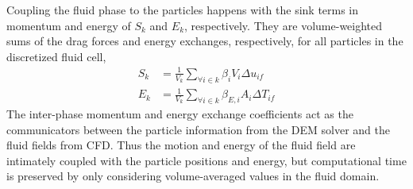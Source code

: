 Coupling the fluid phase to the particles happens with the sink terms in momentum and energy of $S_k$ and $E_k$, respectively. They are volume-weighted sums of the drag forces and energy exchanges, respectively, for all particles in the discretized fluid cell,
\begin{subequations}
\begin{align}
	S_k &= \frac{1}{V_k}\sum_{\forall i \in k} \beta_i V_i \Delta u_{if} \label{eq:cfd-mom-source}\\
	E_k &= \frac{1}{V_k}\sum_{\forall i \in k} \beta_{E,i} A_i \Delta T_{if}
\end{align}
\end{subequations}
The inter-phase momentum and energy exchange coefficients act as the communicators between the particle information from the DEM solver and the fluid fields from CFD. Thus the motion and energy of the fluid field are intimately coupled with the particle positions and energy, but computational time is preserved by only considering volume-averaged values in the fluid domain. %





